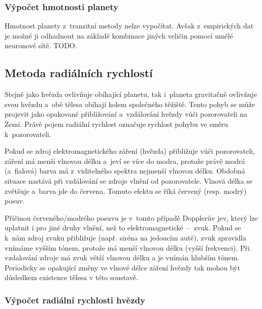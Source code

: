 \documentclass[a4paper,12pt]{article}
\begin{document}
{{

\subsubsection{Výpočet hmotnosti planety}

Hmotnost planety z~tranzitní metody nelze vypočítat. Avšak z~empirických dat je možné ji odhadnout na základě kombinace jiných veličin pomocí umělé neuronové sítě. TODO.~\cite{nnmass}

\clearpage
\subsection{Metoda radiálních rychlostí}

Stejně jako hvězda ovlivňuje obíhající planetu, tak i~planeta gravitačně ovlivňuje svou hvězdu a~obě tělesa obíhají kolem společného těžiště. Tento pohyb se může projevit jako opakované přibližování a~vzdálování hvězdy vůči pozorovateli na Zemi. Právě pojem radiální rychlost označuje rychlost pohybu ve směru k~pozorovateli.~\cite{methods}

Pokud se zdroj elektromagnetického záření (hvězda) přibližuje vůči pozorovateli, záření má menší vlnovou délku a~jeví se více do modra, protože právě modrá (a~fialová) barva má z~viditelného spektra nejmenší vlnovou délku. Obdobná situace nastává při vzdálování se zdroje vlnění od pozorovatele. Vlnová délka se zvětšuje a~barva jde do červena. Tomuto efektu se říká červený (resp. modrý) posuv.~\cite{methods}

\drawgimp

Příčinou červeného/modrého posuvu je v~tomto případě Dopplerův jev, který lze uplatnit i pro jiné druhy vlnění, než to elektromagnetické~--~zvuk. Pokud se k~nám zdroj zvuku přibližuje (např. siréna na jedoucím autě), zvuk zpravidla vnímáme vyšším tónem, protože má menší vlnovou délku (vyšší frekvenci). Při vzdalování zdroje má zvuk větší vlnovou délku a je vnímán hlubším tónem.~\cite{radialvelocity} Periodicky se opakující změny ve vlnové délce záření hvězdy tak mohou být důsledkem existence tělesa v této soustavě.~\cite{methods}

\subsubsection{Výpočet radiální rychlosti hvězdy}

}}
\end{document}
